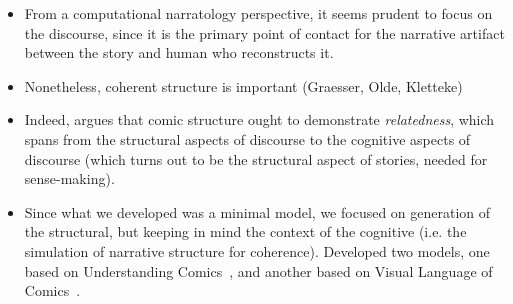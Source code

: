 \begin{itemize}
	\item From a computational narratology perspective, it seems prudent
		to focus on the discourse, since it is the primary point of contact
		for the narrative artifact between the story and human who reconstructs it.
		
	\item Nonetheless, coherent structure is important (Graesser, Olde, Kletteke)
	
	\item Indeed,  argues that comic structure 
		ought to demonstrate \emph{relatedness}, which spans from the structural
		aspects of discourse to the cognitive aspects of discourse (which turns
		out to be the structural aspect of stories, needed for sense-making).
		
	\item Since what we developed was a minimal model, we focused on generation of
		the structural, but keeping in mind the context of the cognitive (i.e.
		the simulation of narrative structure for coherence). Developed two models,
		one based on Understanding Comics~\cite{mcCloud1993understanding}, and
		another based on Visual Language of Comics~\cite{cohn2013visual}.
\end{itemize}




